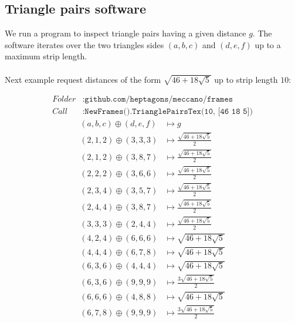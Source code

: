 \documentclass[11pt]{article}
\begin{document}
\subsection{Triangle pairs software}

We run a program to inspect triangle pairs having a given distance $g$. The software iterates
over the two triangles sides $(a,b,c)$ and $(d,e,f)$ up to a maximum strip length.
\\\\
Next example request distances of the form $\sqrt{46+18\sqrt{5}}$ up to strip length $10$:

\begin{align*}
Folder &: \texttt{github.com/heptagons/meccano/frames}\\
Call &: \texttt{NewFrames().TrianglePairsTex(10, [46 18 5])}\end{align*}
\begin{align*}
(a,b,c) \oplus (d,e,f) &\mapsto g\\
\hline
(2,1,2) \oplus (3,3,3) &\mapsto \frac{\sqrt{46+18\sqrt{5}}}{2} \\
(2,1,2) \oplus (3,8,7) &\mapsto \frac{\sqrt{46+18\sqrt{5}}}{2} \\
(2,2,2) \oplus (3,6,6) &\mapsto \frac{\sqrt{46+18\sqrt{5}}}{2} \\
(2,3,4) \oplus (3,5,7) &\mapsto \frac{\sqrt{46+18\sqrt{5}}}{2} \\
(2,4,4) \oplus (3,8,7) &\mapsto \frac{\sqrt{46+18\sqrt{5}}}{2} \\
(3,3,3) \oplus (2,4,4) &\mapsto \frac{\sqrt{46+18\sqrt{5}}}{2} \\
(4,2,4) \oplus (6,6,6) &\mapsto \sqrt{46+18\sqrt{5}} \\
(4,4,4) \oplus (6,7,8) &\mapsto \sqrt{46+18\sqrt{5}} \\
(6,3,6) \oplus (4,4,4) &\mapsto \sqrt{46+18\sqrt{5}} \\
(6,3,6) \oplus (9,9,9) &\mapsto \frac{3\sqrt{46+18\sqrt{5}}}{2} \\
(6,6,6) \oplus (4,8,8) &\mapsto \sqrt{46+18\sqrt{5}} \\
(6,7,8) \oplus (9,9,9) &\mapsto \frac{3\sqrt{46+18\sqrt{5}}}{2} \\
\end{align*}
\end{document}
